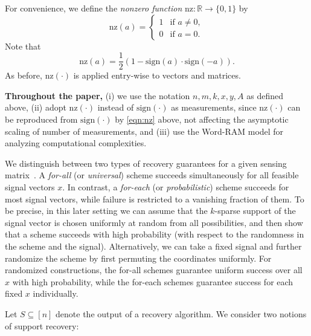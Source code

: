 \documentclass{article}
\newcommand{\supp}{\mathrm{supp}}
\newcommand{\sgn}{\mathrm{sign}}
\newcommand{\nz}{\mathrm{nz}}
\begin{document}
For convenience, we define the \emph{nonzero function} $\nz : \mathbb{R} \to \{0,1\}$ by
\[
\nz(a) =
\begin{cases}
1 & \text{if } a \neq 0,\\
0 & \text{if } a = 0.
\end{cases}
\]
Note that 
\begin{equation}\label{eqn:nz}
    \nz(a) = \frac12(1-\sgn(a)\cdot\sgn(-a)).
\end{equation} As before, $\nz(\cdot)$ is applied entry-wise to vectors and matrices.

\textbf{Throughout the paper,} (i) we use the notation $n, m, k, x, y, A$ as defined above, (ii) adopt $\nz(\cdot)$ instead of $\sgn(\cdot)$ as measurements, since $\nz(\cdot)$ can be reproduced from $\sgn(\cdot)$ by \eqref{eqn:nz} above, not affecting the asymptotic scaling  of number of measurements, and (iii) use the Word-RAM model for analyzing computational complexities. 

We distinguish between two types of recovery guarantees for a given sensing matrix~\cite{acharya2017improved}. A \emph{for-all} (or \emph{universal}) scheme succeeds simultaneously for all feasible signal vectors $x$. In contrast, a \emph{for-each} (or \emph{probabilistic}) scheme succeeds for most signal vectors, while failure is restricted to a vanishing fraction of them.
To be precise, in this later setting we can assume that the $k$-sparse support of the signal vector is chosen uniformly at random from all possibilities, and then show that a scheme succeeds with high probability (with respect to the randomness in the scheme and the signal). Alternatively, we can take a fixed signal and further randomize the scheme by first permuting the coordinates uniformly. For randomized constructions, the for-all schemes guarantee uniform success over all $x$ with high probability, while the for-each schemes guarantee success for each fixed $x$ individually.

Let $S \subseteq [n]$ denote the output of a recovery algorithm. We consider two notions of support recovery:
\end{document}
